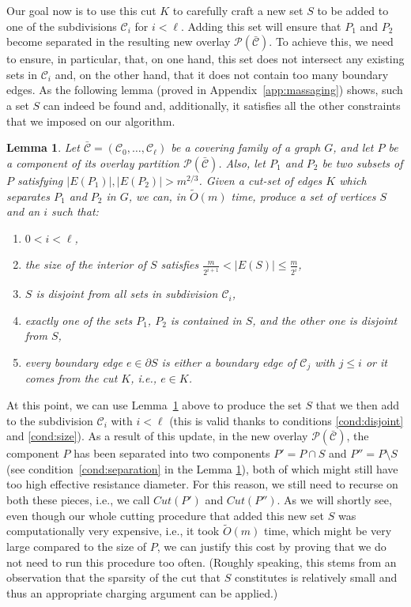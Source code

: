 \documentclass[11pt, letterpaper]{article}
\newtheorem{lemma}[theorem]{Lemma}
\newcommand{\cC}{\mathcal{C}}
\newcommand{\ocC}{\bar{\mathcal{C}}}
\newcommand{\cP}{\mathcal{P}}
\newcommand{\tO}{\widetilde{O}}
\newcommand{\cut}{{K}}
\begin{document}
Our goal now is to use this cut $\cut$ to carefully craft a new set $S$ to be added to one of the subdivisions $\cC_i$ for $i<\ell$. Adding this set will ensure that $P_1$ and $P_2$ become separated in the resulting new overlay $\cP(\ocC)$. To achieve this, we need to ensure, in particular, that, on one hand, this set does not intersect any existing sets in $\cC_i$ and, on the other hand, that it does not contain too many boundary edges. As the following lemma (proved in Appendix~\ref{app:massaging}) shows, such a set $S$ can indeed be found and, additionally, it satisfies all the other constraints that we imposed on our algorithm. 

\begin{lemma} \label{lem:massaging}
Let $\ocC = (\cC_0,\ldots,\cC_\ell)$ be a covering family of a graph $G$, and let $P$ be a component of its overlay partition $\cP(\ocC)$. Also, let $P_1$ and $P_2$ be two subsets of $P$ satisfying $|E(P_1)|, |E(P_2)| > m^{2/3}$. Given a cut-set of edges $\cut$ which separates $P_1$ and $P_2$ in $G$, we can, in $\tO(m)$ time, produce a set of vertices $S$ and an $i$ such that:
\vspace{-7pt}
\begin{enumerate}[(1)]\addtolength{\itemsep}{-.5\baselineskip}
	\item $0 < i < \ell$, \label{cond:i_0_ell}
	\item the size of the interior of $S$ satisfies $\frac{m}{2^{i+1}} < |E(S)| \le \frac{m}{2^{i}}$, \label{cond:size}
	\item $S$ is disjoint from all sets in subdivision $\cC_i$, \label{cond:disjoint}
	\item exactly one of the sets $P_1$, $P_2$ is contained in $S$, and the other one is disjoint from $S$, \label{cond:separation}
	\item every boundary edge $e \in \partial S$ is either a boundary edge of $\cC_j$ with $j \le i$ or it comes from the cut $\cut$, i.e., $e \in \cut$. \label{cond:boundary_edges}
\end{enumerate}
\end{lemma}

At this point, we can use Lemma~\ref{lem:massaging} above to produce the set $S$ that we then add to the subdivision $\cC_i$ with $i < \ell$ (this is valid thanks to conditions \eqref{cond:disjoint} and \eqref{cond:size}).
As a result of this update, in the new overlay $\cP(\ocC)$, the component $P$ has been separated into two components $P' = P \cap S$ and $P'' = P \setminus S$ (see condition~\eqref{cond:separation} in the Lemma \ref{lem:massaging}), both of which might still have too high effective resistance diameter. For this reason, we still need to recurse on both these pieces, i.e., we call $Cut(P')$ and $Cut(P'')$. As we will shortly see, even though our whole cutting procedure that added this new set $S$ was computationally very expensive, i.e., it took $\tO(m)$ time, which might be very large compared to the size of $P$, we can justify this cost by proving that we do not need to run this procedure too often. (Roughly speaking, this stems from an observation that the sparsity of the cut that $S$ constitutes is relatively small and thus an appropriate charging argument can be applied.)
\end{document}
